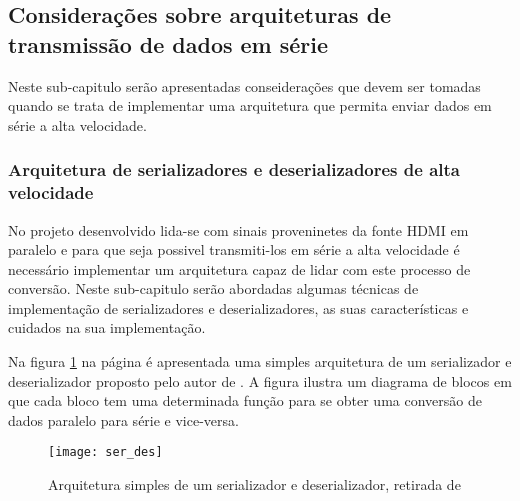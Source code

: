 %

\subsection{Considerações sobre arquiteturas de transmissão de dados em série}
Neste sub-capitulo serão apresentadas conseiderações que devem ser tomadas quando se trata de implementar uma arquitetura que permita enviar dados em série a alta velocidade.
\subsubsection*{Arquitetura de serializadores e deserializadores de alta velocidade}

No projeto desenvolvido lida-se com sinais proveninetes da fonte HDMI em paralelo e para que seja possivel transmiti-los em série a alta velocidade é necessário implementar um arquitetura capaz de lidar com este processo de conversão. Neste sub-capitulo serão abordadas algumas técnicas de implementação de serializadores e deserializadores, as suas características e cuidados na sua implementação.

Na figura \ref{fig:arquiteturaSER} na página \pageref{fig:arquiteturaSER} é apresentada uma simples arquitetura de um serializador e deserializador proposto pelo autor de \cite{R032}. A figura ilustra um diagrama de blocos em que cada bloco tem uma determinada função para se obter uma conversão de dados paralelo para série e vice-versa.

\begin{figure}[h!]
	\begin{center}
		\leavevmode
		\texttt{[image: ser\_des]}
		\caption{Arquitetura simples de um serializador e deserializador, retirada de \cite{R032}}
		\label{fig:arquiteturaSER}
	\end{center}
\end{figure}

